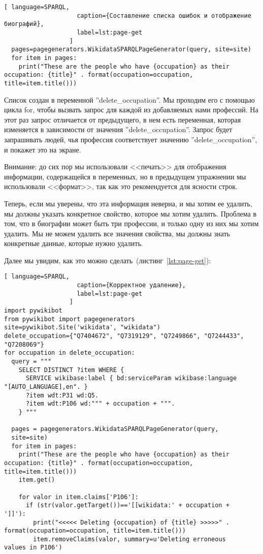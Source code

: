 {\begin{lstlisting}[ language=SPARQL,
                    caption={Составление списка ошибок и отображение биографий},
                    label=lst:page-get
                  ]
  pages=pagegenerators.WikidataSPARQLPageGenerator(query, site=site)
  for item in pages:
    print("These are the people who have {occupation} as their 
occupation: {title}" . format(occupation=occupation, 
title=item.title()))
\end{lstlisting} 

Список создан в переменной ''delete\_occupation''. Мы проходим его с помощью цикла for, чтобы вызвать запрос для каждой из добавляемых нами профессий. На этот раз запрос отличается от предыдущего, в нем есть переменная, которая изменяется в зависимости от значения ''delete\_occupation''. Запрос будет запрашивать людей, чья профессия соответствует значению ''delete\_occupation'', и покажет это на экране.

Внимание: до сих пор мы использовали <<печать>> для отображения информации, содержащейся в переменных, но в предыдущем упражнении мы использовали <<формат>>, так как это рекомендуется для ясности строк.

Теперь, если мы уверены, что эта информация неверна, и мы хотим ее удалить, мы должны указать конкретное свойство, которое мы хотим удалить. Проблема в том, что в биографии может быть три профессии, и только одну из них мы хотим удалить. Мы не можем удалить все значения свойства, мы должны знать конкретные данные, которые нужно удалить.

Далее мы увидим, как это можно сделать~(листинг~\ref{lst:page-get}):

\begin{lstlisting}[ language=SPARQL,
                    caption={Корректное удаление},
                    label=lst:page-get
                  ]
import pywikibot
from pywikibot import pagegenerators
site=pywikibot.Site('wikidata', "wikidata")
delete_occupation={"Q7404672", "Q7319129", "Q7249866", "Q7244433", 
"Q7208069"}
for occupation in delete_occupation:
  query = """
    SELECT DISTINCT ?item WHERE {
      SERVICE wikibase:label { bd:serviceParam wikibase:language 
"[AUTO_LANGUAGE],en". }
      ?item wdt:P31 wd:Q5.
      ?item wdt:P106 wd:""" + occupation + """.
    } """

  pages = pagegenerators.WikidataSPARQLPageGenerator(query, 
  site=site)
  for item in pages:
    print("These are the people who have {occupation} as their 
occupation: {title}" . format(occupation=occupation, 
title=item.title()))
    item.get()

    for valor in item.claims['P106']:
      if (str(valor.getTarget())=='[[wikidata:' + occupation + 
']]'):
        print("<<<<< Deleting {occupation} of {title} >>>>>" . 
format(occupation=occupation, title=item.title()))
        item.removeClaims(valor, summary=u'Deleting erroneous 
values in P106')
\end{lstlisting} 

}
